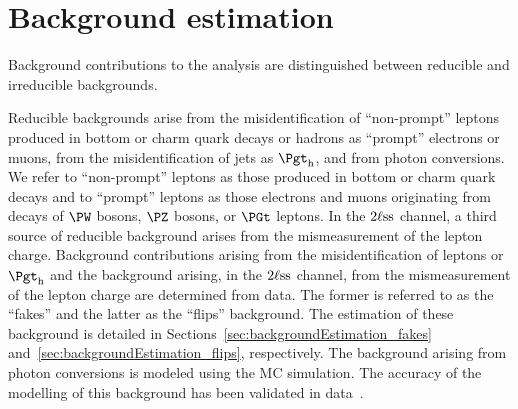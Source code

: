 \section{Background estimation}
\label{sec:backgroundEstimation}

Background contributions to the analysis are distinguished between reducible and irreducible backgrounds.

Reducible backgrounds arise from the misidentification of ``non-prompt'' leptons produced in bottom or charm quark decays or hadrons as ``prompt'' electrons or muons,
from the misidentification of jets as $\tauh$, and from photon conversions.
We refer to ``non-prompt'' leptons as those produced in bottom or charm quark decays 
and to ``prompt'' leptons as those electrons and muons originating from decays of $\PW$ bosons, $\PZ$ bosons, or $\PGt$ leptons.
In the $2\ell\text{ss}$ channel, a third source of reducible background arises from the mismeasurement of the lepton charge.
Background contributions arising from the misidentification of leptons or $\tauh$ and the background arising, in the $2\ell\text{ss}$ channel, 
from the mismeasurement of the lepton charge are determined from data.
The former is referred to as the ``fakes'' and the latter as the ``flips'' background.
The estimation of these background is detailed in Sections~\ref{sec:backgroundEstimation_fakes} and~\ref{sec:backgroundEstimation_flips}, respectively.
The background arising from photon conversions is modeled using the MC simulation.
The accuracy of the modelling of this background has been validated in data~\cite{Sirunyan:2020icl}.

